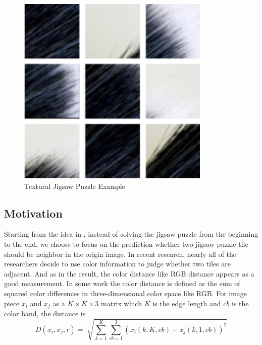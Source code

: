 \documentclass{article}
\begin{document}
\begin{figure}
\begin{minipage}{\textwidth}
\begin{minipage}{.49\textwidth}
\begin{minipage}{.49\textwidth}
            \end{minipage}
            \begin{minipage}{.49\textwidth}
                \centering
                \includegraphics[width=\textwidth]{puzzle_texure}
            \end{minipage}
            \caption{Textural Jigsaw Puzzle Example}
            \label{fig:texurejigsawpuzzle}
        \end{minipage}
    \end{minipage}
\end{figure}

\subsection{Motivation}

Starting from the idea in \cite{sholomon2016dnn}, instead of solving the jigsaw puzzle from the beginning to the end, we choose to focus on the prediction whether two jigsaw puzzle tile should be neighbor in the origin image. In recent research, nearly all of the researchers decide to use color information to judge whether two tiles are adjacent. And as in the result, the color distance like RGB distance appears as a good measurement. In some work\cite{sholomon2013genetic} the color distance is defined as the sum of squared color differences in three-dimensional color space like RGB. For image piece $x_i$ and $x_j$ as a $K\times K\times 3$ matrix which $K$ is the edge length and $cb$ is the color band, the distance is
$$
D(x_i,x_j,r)=\sqrt[]{\sum^K_{k=1}\sum^3_{cb=1}(x_i(k,K,cb)-x_j(k,1,cb))^2}
$$
\end{document}
